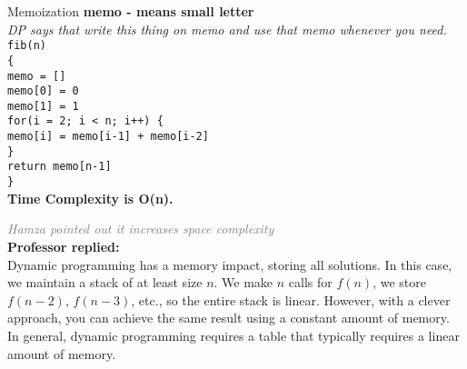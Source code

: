 \begin{frame}{Memoization}
\textbf{memo - means small letter}\\
 \vspace{1em}
\textit{DP says that write this thing on memo and use that memo whenever you need.}\\
 \vspace{1em}
    \texttt{fib(n)} \\
    \texttt{\{} \\
    \hspace{1em} \texttt{memo = []} \\
    \hspace{2em} \texttt{memo[0] = 0} \\
    \hspace{2em} \texttt{memo[1] = 1} \\
    \hspace{1em} \texttt{for(i = 2; i < n; i++) \{} \\
    \hspace{2em} \texttt{memo[i] = memo[i-1] + memo[i-2]} \\
    \hspace{1em} \texttt{\}} \\
    \hspace{1em} \texttt{return memo[n-1]} \\
    \texttt{\}}\\
\textbf{Time Complexity is O(n).}\\
\end{frame}
\begin{frame}
\small
\textit{\textcolor{gray}{Hamza pointed out it increases space complexity}} \\
\vspace{1em}
\textbf{Professor replied:} \\
Dynamic programming has a memory impact, storing all solutions. 
In this case, we maintain a stack of at least size $n$. 
We make $n$ calls for $f(n)$, we store $f(n-2)$, $f(n-3)$, etc., so the entire stack is linear. 
However, with a clever approach, you can achieve the same result using a constant amount of memory. 
In general, dynamic programming requires a table that typically requires a linear amount of memory.
\end{frame}

